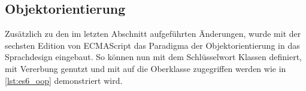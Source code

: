 \subsection{Objektorientierung}
\label{ssec:ge_objektorientierung}

Zusätzlich zu den im letzten Abschnitt aufgeführten Änderungen, wurde mit der
sechsten Edition von ECMAScript das Paradigma der Objektorientierung in das
Sprachdesign eingebaut.  So können nun mit dem Schlüsselwort 
Klassen definiert, mit  Vererbung genutzt und mit  auf
die Oberklasse zugegriffen werden wie in \cref{lst:es6_oop} demonstriert wird.


